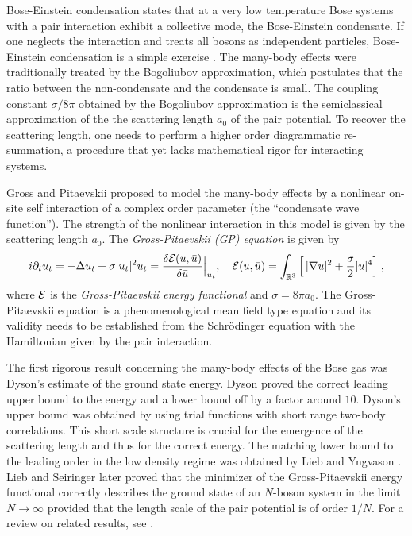 \documentclass[11pt]{article}
\newcommand{\bR}{{\mathbb R}}
\newcommand{\cE}{{\cal E}}
\begin{document}
Bose-Einstein condensation states that at a very low temperature
Bose systems with a pair interaction exhibit a  collective mode, the
Bose-Einstein condensate.  If one neglects the interaction and
treats all bosons as independent particles, Bose-Einstein
condensation is a simple exercise \cite{Hu}. The many-body effects
were traditionally treated by the Bogoliubov approximation, which
postulates that the ratio between the
non-condensate and the condensate is small. The coupling constant
$\sigma/8 \pi$ obtained by the Bogoliubov  approximation is the
semiclassical approximation of the the scattering length $a_0$ of
the pair potential. To recover the scattering length, one needs to
perform a higher order diagrammatic re-summation,  a procedure that
yet lacks mathematical rigor for interacting  systems.



Gross \cite{G1,G2} and Pitaevskii \cite{P} proposed to model the
many-body effects by a nonlinear on-site self interaction of a
complex order parameter (the ``condensate wave function''). The
strength of the nonlinear interaction in this model is given by the
scattering length $a_0$. The {\it Gross-Pitaevskii (GP) equation} is
given by
\begin{equation}\label{nls}
i \partial_t u_t     = -\Delta u_t     +  \sigma |u_t|^2 u_t =
\frac{\delta \cE(u, \bar{u})}{\delta \bar{u}} \Big|_{u_t}, \quad
\cE(u, \bar u)= \int_{\bR^3} \Big [ \, |\nabla u|^2 + \frac {\sigma}
2 |u|^4 \Big ]\; ,
\end{equation}
where $\cE$ is the {\it Gross-Pitaevskii energy functional} and
$\sigma= 8 \pi a_0$. The Gross-Pitaevskii equation is a
phenomenological mean field type equation and its validity needs to
be established from the Schr\"odinger equation with the Hamiltonian
given by the pair interaction.


The first rigorous result concerning the many-body effects of the
Bose gas was Dyson's estimate of the ground state energy. Dyson
\cite{Dy} proved the correct leading upper bound to the energy and a
lower bound off by a factor around $10$.  Dyson's upper bound was obtained
by using trial functions with short range two-body correlations.
This short scale structure
is crucial for the emergence of the scattering length and
thus for the correct energy.
The matching lower bound
to the leading order in the low density regime  was obtained  by
Lieb and Yngvason \cite{LY1}.   Lieb and Seiringer \cite{LS} later
proved that the minimizer of the Gross-Pitaevskii energy functional
correctly describes the ground state of an
 $N$-boson system  in the limit $N\to \infty$
provided that   the  length scale of the pair potential is  of order
$1/N$. For a review on related results, see \cite{LSSY}.
\end{document}
